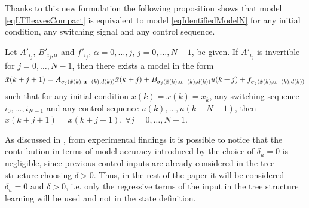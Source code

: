Thanks to this new formulation the following proposition shows that model \eqref{eqLTIleavesCompact} is equivalent to model \eqref{eqIdentifiedModelN} for any initial condition, any switching signal and any control sequence.
\begin{proposition}\label{propSwitchingSystem}\cite{smarraNAHS2020}
	Let $A'_{i_j}$, $B'_{i_j,\alpha}$ and $f'_{i_j}$, $\alpha=0,\ldots,j$, $j=0,\ldots,N-1$, be given. If $A'_{i_j}$ is invertible for $j=0,\ldots,N-1$, then there exists a model in the form
	\vspace{-0.2cm}
	\small
	\begin{equation*}
	\bar x({k+j+1}) = A_{\sigma_j(\bar x(k),\bold{u^-}(k), d(k))} \bar x({k+j})+B_{\sigma_j(\bar x(k),\bold{u^-}(k), d(k))} u({k+j})+ f_{\sigma_j(\bar x(k),\bold{u^-}(k), d(k))}	
	\end{equation*}
	\normalsize
	such that for any initial condition $\bar x(k) = x(k) = x_k$, any switching sequence $i_0, \ldots, i_{N-1}$ and any control sequence $u(k),\ldots,u(k+N-1)$, then $\bar x(k+j+1) = x(k+j+1),\ \forall j=0,\ldots,N-1$.
\end{proposition}

As discussed in \cite{smarraNAHS2020}, from experimental findings it is possible to notice that the contribution in terms of model accuracy introduced by the choice of $\delta_u = 0$ is negligible, since previous control inputs are already considered in the tree structure choosing $\delta > 0$. Thus, in the rest of the paper it will be considered $\delta_u = 0$ and $\delta > 0$, i.e. only the regressive terms of the input in the tree structure learning will be used and not in the state definition.

